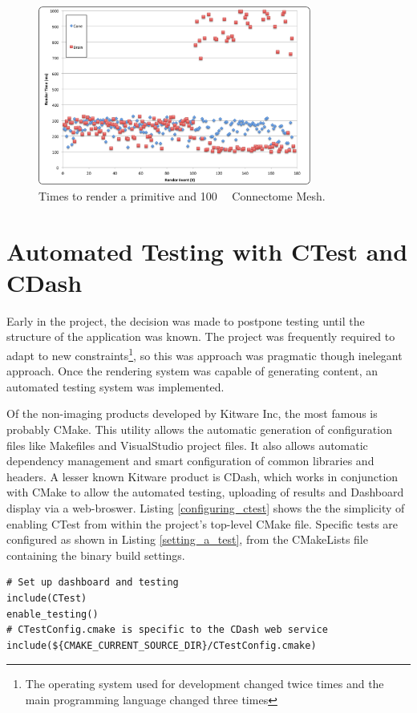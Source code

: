 \documentclass[MSc,paper=a4,pagesize=auto]{icldt}
\begin{document}
\begin{figure}[htbp!]
    \centering
    \includegraphics[width=0.8\textwidth]{resources/render_times}
    \caption{Times to render a primitive and \SI{100}{\mega\byte} Connectome Mesh.}
    \label{fig:render_times}
\end{figure}



\section{Automated Testing with CTest and CDash}
Early in the project, the decision was made to postpone testing until the structure of the application was known. The project was frequently required to adapt to new constraints\footnote{The operating system used for development changed twice times and the main programming language changed three times}, so this was approach was pragmatic though inelegant approach. Once the rendering system was capable of generating content, an automated testing system was implemented.

Of the non-imaging products developed by Kitware Inc, the most famous is probably CMake. This utility allows the automatic generation of configuration files like Makefiles and VisualStudio project files. It also allows automatic dependency management and smart configuration of common libraries and headers. A lesser known Kitware product is CDash, which works in conjunction with CMake to allow the automated testing, uploading of results and Dashboard display via a web-broswer. Listing \ref{configuring_ctest} shows the the simplicity of enabling CTest from within the project's top-level CMake file. Specific tests are configured as shown in Listing \ref{setting_a_test}, from the CMakeLists file containing the binary build settings.

\begin{lstlisting}[label=configuring_ctest, caption=Enabling CTest in the CMakeLists]
# Set up dashboard and testing
include(CTest)
enable_testing()
# CTestConfig.cmake is specific to the CDash web service
include(${CMAKE_CURRENT_SOURCE_DIR}/CTestConfig.cmake)
\end{lstlisting}
\end{document}

